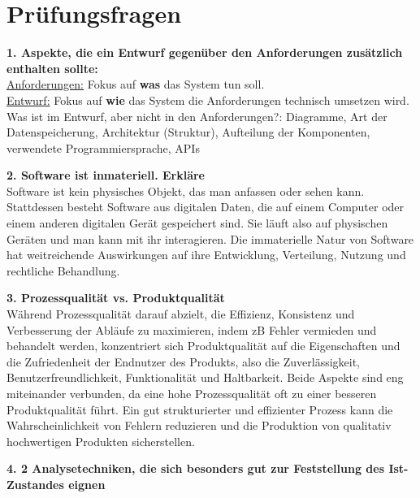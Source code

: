 \documentclass{article}
\begin{document}
\section*{Prüfungsfragen}
\textbf{1. Aspekte, die ein Entwurf gegenüber den Anforderungen zusätzlich enthalten sollte:}\\
\underline{Anforderungen:} Fokus auf \textbf{was} das System tun soll.\\
\underline{Entwurf:} Fokus auf \textbf{wie} das System die Anforderungen technisch umsetzen wird.\\
Was ist im Entwurf, aber nicht in den Anforderungen?: Diagramme, Art der Datenspeicherung, Architektur (Struktur), Aufteilung der Komponenten, verwendete Programmiersprache, APIs \\
\textbf{2. Software ist inmateriell. Erkläre}\\
Software ist kein physisches Objekt, das man anfassen oder sehen kann. Stattdessen besteht Software aus digitalen Daten, die auf einem Computer oder einem anderen digitalen Gerät gespeichert sind. Sie läuft also auf physischen Geräten und man kann mit ihr interagieren. Die immaterielle Natur von Software hat weitreichende Auswirkungen auf ihre Entwicklung, Verteilung, Nutzung und rechtliche Behandlung.\\
\textbf{3. Prozessqualität vs. Produktqualität}\\
Während Prozessqualität darauf abzielt, die Effizienz, Konsistenz und Verbesserung der Abläufe zu maximieren, indem zB Fehler vermieden und behandelt werden, konzentriert sich Produktqualität auf die Eigenschaften und die Zufriedenheit der Endnutzer des Produkts, also die Zuverlässigkeit, Benutzerfreundlichkeit, Funktionalität und Haltbarkeit. Beide Aspekte sind eng miteinander verbunden, da eine hohe Prozessqualität oft zu einer besseren Produktqualität führt. Ein gut strukturierter und effizienter Prozess kann die Wahrscheinlichkeit von Fehlern reduzieren und die Produktion von qualitativ hochwertigen Produkten sicherstellen.\\
\textbf{4. 2 Analysetechniken, die sich besonders gut zur Feststellung des Ist-Zustandes eignen}\\
\end{document}
